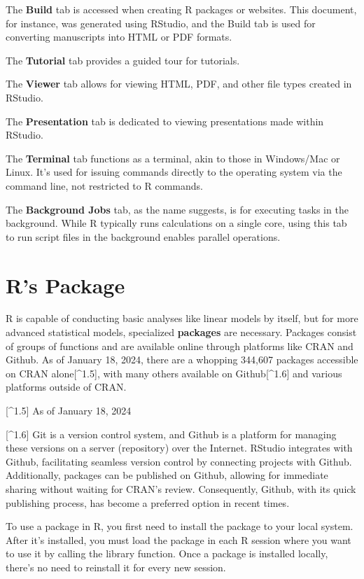 \documentclass[
  a4paper,
]{book}
\begin{document}
The \textbf{Build} tab is accessed when creating R packages or websites.
This document, for instance, was generated using RStudio, and the Build
tab is used for converting manuscripts into HTML or PDF formats.

The \textbf{Tutorial} tab provides a guided tour for tutorials.

The \textbf{Viewer} tab allows for viewing HTML, PDF, and other file
types created in RStudio.

The \textbf{Presentation} tab is dedicated to viewing presentations made
within RStudio.

The \textbf{Terminal} tab functions as a terminal, akin to those in
Windows/Mac or Linux. It's used for issuing commands directly to the
operating system via the command line, not restricted to R commands.

The \textbf{Background Jobs} tab, as the name suggests, is for executing
tasks in the background. While R typically runs calculations on a single
core, using this tab to run script files in the background enables
parallel operations.

\section{R's Package}\label{rs-package}

R is capable of conducting basic analyses like linear models by itself,
but for more advanced statistical models, specialized \textbf{packages}
are necessary. Packages consist of groups of functions and are available
online through platforms like CRAN and Github. As of January 18, 2024,
there are a whopping 344,607 packages accessible on CRAN
alone{[}\^{}1.5{]}, with many others available on Github{[}\^{}1.6{]}
and various platforms outside of CRAN.

{[}\^{}1.5{]} As of January 18, 2024

{[}\^{}1.6{]} Git is a version control system, and Github is a platform
for managing these versions on a server (repository) over the Internet.
RStudio integrates with Github, facilitating seamless version control by
connecting projects with Github. Additionally, packages can be published
on Github, allowing for immediate sharing without waiting for CRAN's
review. Consequently, Github, with its quick publishing process, has
become a preferred option in recent times.

To use a package in R, you first need to install the package to your
local system. After it's installed, you must load the package in each R
session where you want to use it by calling the library function. Once a
package is installed locally, there's no need to reinstall it for every
new session.
\end{document}
